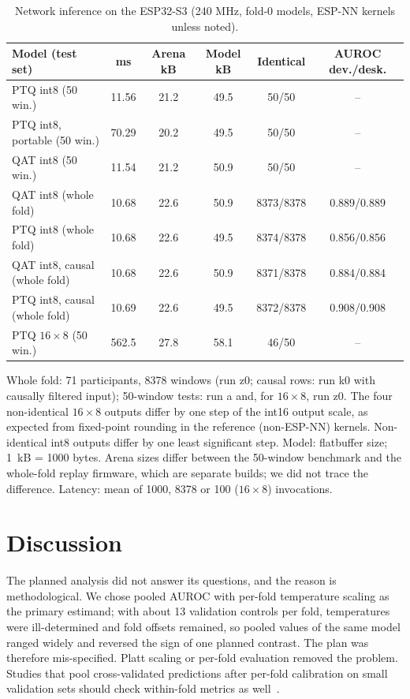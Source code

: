 \documentclass[preprint,12pt]{elsarticle}
\begin{document}
\begin{table}[!t]
\caption{Network inference on the ESP32-S3 (240 MHz, fold-0 models, ESP-NN kernels unless noted).}
\label{tab:board}
\centering\scriptsize
\setlength{\tabcolsep}{2.5pt}
\begin{tabular*}{\linewidth}{@{\extracolsep{\fill}}lccccc@{}}
\toprule
Model (test set) & ms & Arena kB & Model kB & Identical & AUROC dev./desk. \\
\midrule
PTQ int8 (50 win.) & 11.56 & 21.2 & 49.5 & 50/50 & -- \\
PTQ int8, portable (50 win.) & 70.29 & 20.2 & 49.5 & 50/50 & -- \\
QAT int8 (50 win.) & 11.54 & 21.2 & 50.9 & 50/50 & -- \\
QAT int8 (whole fold) & 10.68 & 22.6 & 50.9 & 8373/8378 & 0.889/0.889 \\
PTQ int8 (whole fold) & 10.68 & 22.6 & 49.5 & 8374/8378 & 0.856/0.856 \\
QAT int8, causal (whole fold) & 10.68 & 22.6 & 50.9 & 8371/8378 & 0.884/0.884 \\
PTQ int8, causal (whole fold) & 10.69 & 22.6 & 49.5 & 8372/8378 & 0.908/0.908 \\
PTQ $16\times8$ (50 win.) & 562.5 & 27.8 & 58.1 & 46/50 & -- \\
\bottomrule
\end{tabular*}

\vspace{2pt}\parbox{\linewidth}{\footnotesize Whole fold: 71 participants, 8378 windows (run z0; causal rows: run k0 with causally filtered input); 50-window tests: run a and, for $16\times8$, run z0. The four non-identical $16\times8$ outputs differ by one step of the int16 output scale, as expected from fixed-point rounding in the reference (non-ESP-NN) kernels. Non-identical int8 outputs differ by one least significant step. Model: flatbuffer size; 1~kB = 1000 bytes. Arena sizes differ between the 50-window benchmark and the whole-fold replay firmware, which are separate builds; we did not trace the difference. Latency: mean of 1000, 8378 or 100 ($16\times8$) invocations.}
\end{table}

\section{Discussion}
\label{sec:discussion}
The planned analysis did not answer its questions, and the reason is methodological. We chose pooled AUROC with per-fold temperature scaling as the primary estimand; with about 13 validation controls per fold, temperatures were ill-determined and fold offsets remained, so pooled values of the same model ranged widely and reversed the sign of one planned contrast. The plan was therefore mis-specified. Platt scaling or per-fold evaluation removed the problem. Studies that pool cross-validated predictions after per-fold calibration on small validation sets should check within-fold metrics as well~\cite{Forman2010,Airola2011,Varoquaux2018}.
\end{document}

